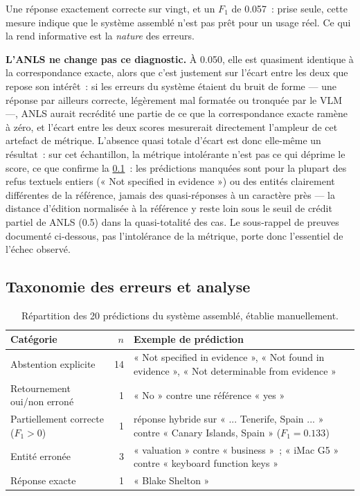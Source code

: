 Une réponse exactement correcte sur vingt, et un $F_1$ de \num{0.057}~: prise
seule, cette mesure indique que le système assemblé n'est pas prêt pour un
usage réel. Ce qui la rend informative est la \emph{nature} des erreurs.

\textbf{L'ANLS ne change pas ce diagnostic.} À \num{0.050}, elle est
quasiment identique à la correspondance exacte, alors que c'est justement sur
l'écart entre les deux que repose son intérêt~: si les erreurs du système
étaient du bruit de forme --- une réponse par ailleurs correcte, légèrement
mal formatée ou tronquée par le VLM ---, ANLS aurait recrédité une partie de
ce que la correspondance exacte ramène à zéro, et l'écart entre les deux
scores mesurerait directement l'ampleur de cet artefact de métrique.
L'absence quasi totale d'écart est donc elle-même un résultat~: sur cet
échantillon, la métrique intolérante n'est pas ce qui déprime le score, ce que
confirme la \cref{sec-res_d_erreurs}~: les prédictions manquées sont pour la
plupart des refus textuels entiers (« Not specified in evidence ») ou des
entités clairement différentes de la référence, jamais des quasi-réponses à
un caractère près --- la distance d'édition normalisée à la référence y reste
loin sous le seuil de crédit partiel de ANLS (\num{0.5}) dans la quasi-totalité
des cas. Le sous-rappel de preuves documenté ci-dessous, pas l'intolérance de
la métrique, porte donc l'essentiel de l'échec observé.

\subsection{Taxonomie des erreurs et analyse}
\label{sec-res_d_erreurs}

\begin{table}[t]
\centering
\small
\caption[Taxonomie des erreurs bout-en-bout]{Répartition des \num{20}
prédictions du système assemblé, établie manuellement.}
\label{tab-res_erreurs}
\begin{tabularx}{\textwidth}{@{}l r X@{}}
\toprule
Catégorie & $n$ & Exemple de prédiction \\
\midrule
Abstention explicite & \num{14} & « Not specified in evidence », « Not found in evidence », « Not determinable from evidence » \\
Retournement oui/non erroné & \num{1} & « No » contre une référence « yes » \\
Partiellement correcte ($F_1 > 0$) & \num{1} & réponse hybride sur « ... Tenerife, Spain ... » contre « Canary Islands, Spain » ($F_1 = \num{0.133}$) \\
Entité erronée & \num{3} & « valuation » contre « business »~; « iMac G5 » contre « keyboard function keys » \\
Réponse exacte & \num{1} & « Blake Shelton » \\
\bottomrule
\end{tabularx}
\end{table}

